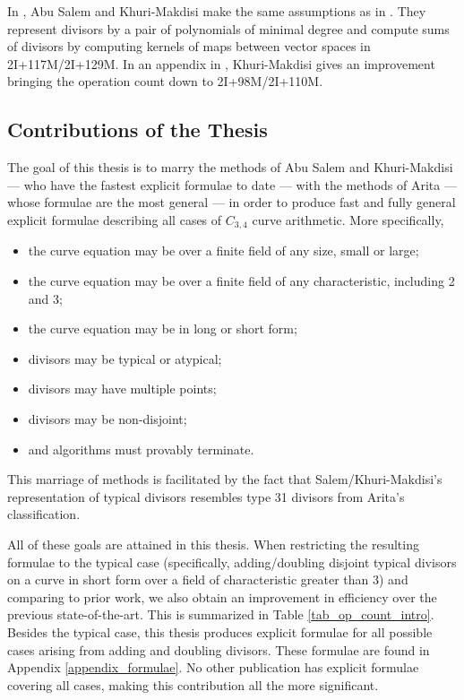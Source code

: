 In \cite{salem07}, Abu Salem and Khuri-Makdisi make the same assumptions as in \cite{flon08}.
They represent divisors by a pair of polynomials of minimal degree and compute sums of divisors
by computing kernels of maps between vector spaces in 2I+117M/2I+129M.
In an appendix in \cite{kmakdisi18},
Khuri-Makdisi gives an improvement bringing the operation count down to 2I+98M/2I+110M.




\subsection{Contributions of the Thesis}

The goal of this thesis is to marry the methods of Abu Salem and Khuri-Makdisi ---
who have the fastest explicit formulae to date ---
with the methods of Arita --- whose formulae are the most general ---
in order to produce fast and fully general explicit formulae describing all cases of $C_{3,4}$ curve arithmetic.
More specifically,
\begin{itemize}[itemsep=0pt]
  \item the curve equation may be over a finite field of any size, small or large;
  \item the curve equation may be over a finite field of any characteristic, including 2 and 3;
  \item the curve equation may be in long or short form;
  \item divisors may be typical or atypical;
  \item divisors may have multiple points;
  \item divisors may be non-disjoint;
  \item and algorithms must provably terminate.
\end{itemize}
This marriage of methods is facilitated by the fact that Salem/Khuri-Makdisi's representation of typical divisors resembles type 31 divisors from Arita's classification.

All of these goals are attained in this thesis.
When restricting the resulting formulae to the typical case
(specifically, adding/doubling disjoint typical divisors on a curve in short form over a field of characteristic greater than 3)
and comparing to prior work, we also obtain an improvement in efficiency over the previous state-of-the-art.
This is summarized in Table \ref{tab_op_count_intro}.
Besides the typical case,
this thesis produces explicit formulae for all possible cases arising from adding and doubling divisors.
These formulae are found in Appendix \ref{appendix_formulae}.
No other publication has explicit formulae covering all cases,
making this contribution all the more significant.

